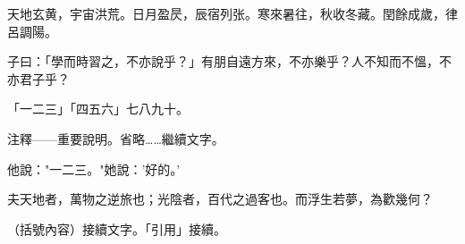 \documentclass{ltc-book}
\begin{document}
\begin{正文}

天地玄黄，宇宙洪荒。日月盈昃，辰宿列张。寒來暑往，秋收冬藏。閏餘成歲，律呂調陽。

子曰：「學而時習之，不亦說乎？」有朋自遠方來，不亦樂乎？人不知而不慍，不亦君子乎？

「一二三」「四五六」七八九十。

注釋——重要說明。省略……繼續文字。

他說："一二三。"她說：'好的。'

夫天地者，萬物之逆旅也；光陰者，百代之過客也。而浮生若夢，為歡幾何？

（括號內容）接續文字。「引用」接續。

\end{正文}
\end{document}
